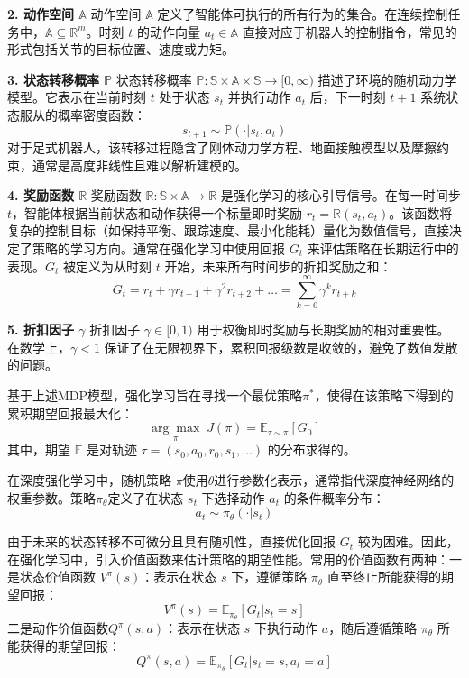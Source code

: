 \textbf{2. 动作空间 $\mathbb{A}$}
动作空间 $\mathbb{A}$ 定义了智能体可执行的所有行为的集合。在连续控制任务中，$\mathbb{A} \subseteq \mathbb{R}^m$。时刻 $t$ 的动作向量 $a_t \in \mathbb{A}$ 直接对应于机器人的控制指令，常见的形式包括关节的目标位置、速度或力矩。

\textbf{3. 状态转移概率 $\mathbb{P}$}
状态转移概率 $\mathbb{P}: \mathbb{S} \times \mathbb{A} \times \mathbb{S} \rightarrow [0, \infty)$ 描述了环境的随机动力学模型。它表示在当前时刻 $t$ 处于状态 $s_t$ 并执行动作 $a_t$ 后，下一时刻 $t+1$ 系统状态服从的概率密度函数：
\begin{equation}
    s_{t+1} \sim \mathbb{P}(\cdot | s_t, a_t)
\end{equation}
对于足式机器人，该转移过程隐含了刚体动力学方程、地面接触模型以及摩擦约束，通常是高度非线性且难以解析建模的。

\textbf{4. 奖励函数 $\mathbb{R}$}
奖励函数 $\mathbb{R}: \mathbb{S} \times \mathbb{A} \rightarrow \mathbb{R}$ 是强化学习的核心引导信号。在每一时间步 $t$，智能体根据当前状态和动作获得一个标量即时奖励 $r_t = \mathbb{R}(s_t, a_t)$。该函数将复杂的控制目标（如保持平衡、跟踪速度、最小化能耗）量化为数值信号，直接决定了策略的学习方向。通常在强化学习中使用回报 $G_t$ 来评估策略在长期运行中的表现。$G_t$ 被定义为从时刻 $t$ 开始，未来所有时间步的折扣奖励之和：
\begin{equation}
    G_t = r_t + \gamma r_{t+1} + \gamma^2 r_{t+2} + \dots = \sum_{k=0}^{\infty} \gamma^k r_{t+k}
\end{equation}

\textbf{5. 折扣因子 $\gamma$}
折扣因子 $\gamma \in [0, 1)$ 用于权衡即时奖励与长期奖励的相对重要性。在数学上，$\gamma < 1$ 保证了在无限视界下，累积回报级数是收敛的，避免了数值发散的问题。

基于上述MDP模型，强化学习旨在寻找一个最优策略$\pi^*$，使得在该策略下得到的累积期望回报最大化：
\begin{equation}
    \underset{\pi}{\arg \max} \; J(\pi) = \mathbb{E}_{\tau \sim \pi} [G_0]
\end{equation}
其中，期望 $\mathbb{E}$ 是对轨迹 $\tau = (s_0, a_0, r_0, s_1, \dots)$ 的分布求得的。

在深度强化学习中，随机策略 $\pi$使用$\theta$进行参数化表示，通常指代深度神经网络的权重参数。策略$\pi_{\theta}$定义了在状态 $s_t$ 下选择动作 $a_t$ 的条件概率分布：
\begin{equation}
    a_t \sim \pi_\theta(\cdot | s_t)
\end{equation}

由于未来的状态转移不可微分且具有随机性，直接优化回报 $G_t$ 较为困难。因此，在强化学习中，引入价值函数来估计策略的期望性能。常用的价值函数有两种：一是状态价值函数 $V^\pi(s)$：表示在状态 $s$ 下，遵循策略 $\pi_{\theta}$ 直至终止所能获得的期望回报：
\begin{equation}
    V^\pi(s) = \mathbb{E}_{\pi_\theta} [G_t | s_t = s]
\end{equation}
二是动作价值函数$Q^\pi(s, a)$：表示在状态 $s$ 下执行动作 $a$，随后遵循策略 $\pi_{\theta}$ 所能获得的期望回报：
\begin{equation}
    Q^\pi(s, a) = \mathbb{E}_{\pi_\theta} [G_t | s_t = s, a_t = a]
\end{equation}

